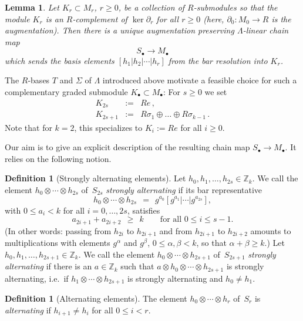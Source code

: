 \documentclass[11pt,a4paper,draft]{article}
\newcommand{\Z}{{\mathbb Z}}
\newcommand{\tens}{\otimes}
\DeclareMathOperator\Kern{ker}
\renewcommand\ker{\Kern}
\newtheorem{lemma}[theorem]{Lemma}
\theoremstyle{definition}
\newtheorem{definition}[theorem]{Definition}
\begin{document}
\begin{lemma} \label{lem:uniqueness}
Let $K_r \subset M_r$, $r \geq 0$,  be a collection of $R$-submodules
so that the module $K_{r}$ is an $R$-complement of $\ker \partial_r$ for all
$r \geq 0$ (here,
$\partial_0 : M_0 \to R$ is the augmentation). 
Then there is a unique augmentation preserving
$\Lambda$-linear chain map
\[
    S_\bullet \to M_\bullet
\]
which sends the basis elements $[h_1|h_2|\cdots|h_r]$ from the bar resolution into $K_r$.
\end{lemma}

The $R$-bases  $T$ and $\Sigma$ of $\Lambda$ introduced above motivate a
feasible choice for such a complementary graded submodule $K_\bullet \subset M_\bullet$: For $s \geq 0$ we
set
\begin{eqnarray*}
     K_{2s} & := & R e \, , \\
     K_{2s+1} & := & R \sigma_1 \oplus \ldots \oplus R \sigma_{k-1} \, .
\end{eqnarray*}
Note that for $k=2$, this specializes to $K_i := Re$ for all $i \geq 0$. 


Our aim is to give an explicit description of the resulting chain  map $S_\bullet \to M_\bullet$.
It relies on the following notion.

\begin{definition}[Strongly alternating elements] \label{def:stralt}
    Let $h_0, h_1, \dots, h_{2s}\in \Z_k$. We call
    the element $h_0 \tens \cdots \tens h_{2s}$ of~$S_{2s}$ \emph{strongly alternating} if
    its bar representative
    \[
        h_0 \tens \cdots \tens h_{2s}\ \ =\ \ g^{a_0} [g^{a_1}|\cdots|g^{a_{2s}}],
    \]
    with $0 \le a_i < k$ for all $i = 0, \dots, 2s$, satisfies
    \[
    a_{2i+1} + a_{2i+2}\ \ \ge\ \ k\qquad\text{for all }0 \le i \le s - 1.
    \]
    (In other words:
    passing from $h_{2i}$ to $h_{2i+1}$ and from $h_{2i+1}$ to $h_{2i+2}$
    amounts to multiplications with elements $g^{\alpha}$ and
    $ g^{\beta}$, $0 \leq \alpha,\beta < k$,
    so that $\alpha + \beta \geq k$.)
    Let $h_0, h_1, \dots, h_{2s+1}\in \Z_k$. We call
    the element $h_0 \tens \cdots \tens h_{2s+1}$ of~$S_{2s+1}$ 
    \emph{strongly alternating} if there is an $a\in\Z_k$ such that
    $a\tens h_0\tens\cdots\tens h_{2s+1}$ is strongly alternating, i.e.~if
    $h_1\tens\cdots\tens h_{2s+1}$ is strongly alternating and $h_0\ne h_1$.
\end{definition}

\begin{definition}[Alternating elements]
The element $h_0\tens\cdots\tens h_r$ of~$S_r$
is \emph{alternating} if $h_{i+1}\ne h_i$ for all $0\le i<r$.
\end{definition}
\end{document}
